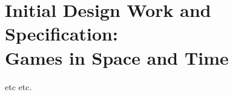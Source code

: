 \chapter[Initial Design Work and Specification]{Initial Design Work and Specification: \\Games in Space and Time}
\label{ch:motivation}


 etc etc. 